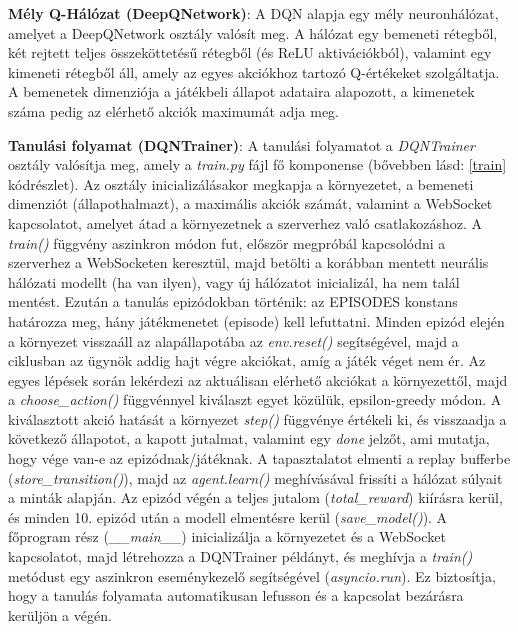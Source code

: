 \documentclass[
]{thesis-ekf}
\theoremstyle{definition}
\theoremstyle{remark}
\begin{document}
	\textbf{Mély Q-Hálózat (DeepQNetwork)}: A DQN alapja egy mély neuronhálózat, amelyet a DeepQNetwork osztály valósít meg. A hálózat egy bemeneti rétegből, két rejtett teljes összeköttetésű rétegből (és ReLU aktivációkból), valamint egy kimeneti rétegből áll, amely az egyes akciókhoz tartozó Q-értékeket szolgáltatja. A bemenetek dimenziója a játékbeli állapot adataira alapozott, a kimenetek száma pedig az elérhető akciók maximumát adja meg. 
	
	\textbf{Tanulási folyamat (DQNTrainer)}: A tanulási folyamatot a \emph{DQNTrainer} osztály valósítja meg, amely a \emph{train.py} fájl fő komponense (bővebben lásd: \ref{train} kódrészlet). Az osztály inicializálásakor megkapja a környezetet, a bemeneti dimenziót (állapothalmazt), a maximális akciók számát, valamint a WebSocket kapcsolatot, amelyet átad a környezetnek a szerverhez való csatlakozáshoz. A \emph{train()} függvény aszinkron módon fut, először megpróbál kapcsolódni a szerverhez a WebSocketen keresztül, majd betölti a korábban mentett neurális hálózati modellt (ha van ilyen), vagy új hálózatot inicializál, ha nem talál mentést. Ezután a tanulás epizódokban történik: az EPISODES konstans határozza meg, hány játékmenetet (episode) kell lefuttatni. Minden epizód elején a környezet visszaáll az alapállapotába az \emph{env.reset()} segítségével, majd a ciklusban az ügynök addig hajt végre akciókat, amíg a játék véget nem ér. Az egyes lépések során lekérdezi az aktuálisan elérhető akciókat a környezettől, majd a \emph{choose\_action()} függvénnyel kiválaszt egyet közülük, epsilon-greedy módon. A kiválasztott akció hatását a környezet \emph{step()} függvénye értékeli ki, és visszaadja a következő állapotot, a kapott jutalmat, valamint egy \emph{done} jelzőt, ami mutatja, hogy vége van-e az epizódnak/játéknak. A tapasztalatot elmenti a replay bufferbe (\emph{store\_transition()}), majd az \emph{agent.learn()} meghívásával frissíti a hálózat súlyait a minták alapján. Az epizód végén a teljes jutalom (\emph{total\_reward}) kiírásra kerül, és minden 10. epizód után a modell elmentésre kerül (\emph{save\_model()}). A főprogram rész (\emph{\_\_main\_\_}) inicializálja a környezetet és a WebSocket kapcsolatot, majd létrehozza a DQNTrainer példányt, és meghívja a \emph{train()} metódust egy aszinkron eseménykezelő segítségével (\emph{asyncio.run}). Ez biztosítja, hogy a tanulás folyamata automatikusan lefusson és a kapcsolat bezárásra kerüljön a végén.
	
	
	
\end{document}
